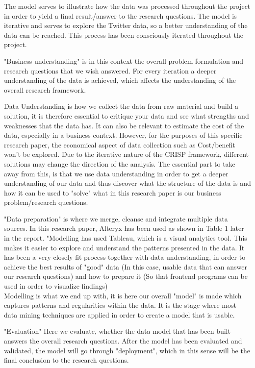 \documentclass[11pt]{article}
\begin{document}
The model serves to illustrate how the data was processed throughout the project in order to yield a final result/answer to the research questions. The model is iterative and serves to explore the Twitter data, so a better
understanding of the data can be reached. This process has been consciously iterated throughout the project.

"Business understanding" is in this context the overall problem formulation and research questions that we wish answered. For every iteration a deeper understanding of the data is achieved, which affects the understanding of the overall research framework.

Data Understanding is how we collect the data from raw material and build a solution, it is therefore essential to critique your data and see what strengths and weaknesses that the data has. It can also be relevant to estimate the cost of the data, especially in a business context. However, for the purposes of this specific research paper, the economical aspect of data collection such as Cost/benefit won't be explored. Due to the iterative nature of the CRISP framework, different solutions may change the direction of the analysis. The essential part to take away from this, is that we use data understanding in order to get a deeper understanding of our data and thus discover what the structure of the data is and how it can be used to "solve" what in this research paper is our business problem/research questions.

"Data preparation" is where we merge, cleanse and integrate multiple data sources. In this research paper, Alteryx has been used as shown in Table 1 later in the report.
"Modelling has used Tableau, which is a visual analytics tool. This makes it easier to explore and understand the patterns presented in the data. It has been a very closely fit process together with data understanding, in order to achieve the best results of "good" data (In this case, usable data that can answer our research questions)  and how to prepare it (So that frontend programs can be used in order to visualize  findings) \\

Modelling is what we end up with, it is here our overall "model" is made which captures patterns and regularities within the data. It is the stage where most data mining techniques are applied in order to create a model that is usable.

"Evaluation" Here we evaluate, whether the data model that has been built answers the overall research questions. After the model has been evaluated and validated, the model will go through "deployment", which in this sense will be the final conclusion to
the research questions.\\
\end{document}
